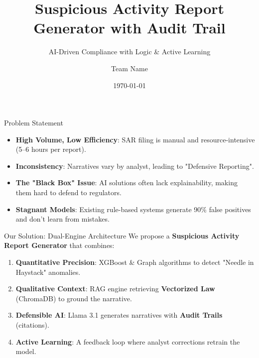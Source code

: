 \documentclass{beamer}
\title{Suspicious Activity Report Generator with Audit Trail}
\subtitle{AI-Driven Compliance with Logic \& Active Learning}
\author{Team Name}
\date{\today}
\begin{document}
\frame{\titlepage}

\begin{frame}{Problem Statement}
    \begin{itemize}
        \item \textbf{High Volume, Low Efficiency}: SAR filing is manual and resource-intensive (5--6 hours per report).
        \item \textbf{Inconsistency}: Narratives vary by analyst, leading to "Defensive Reporting".
        \item \textbf{The "Black Box" Issue}: AI solutions often lack explainability, making them hard to defend to regulators.
        \item \textbf{Stagnant Models}: Existing rule-based systems generate 90\% false positives and don't learn from mistakes.
    \end{itemize}
\end{frame}

\begin{frame}{Our Solution: Dual-Engine Architecture}
    We propose a \textbf{Suspicious Activity Report Generator} that combines:
    \vspace{0.5cm}
    \begin{enumerate}
        \item \textbf{Quantitative Precision}: XGBoost \& Graph algorithms to detect "Needle in Haystack" anomalies.
        \item \textbf{Qualitative Context}: RAG engine retrieving \textbf{Vectorized Law} (ChromaDB) to ground the narrative.
        \item \textbf{Defensible AI}: Llama 3.1 generates narratives with \textbf{Audit Trails} (citations).
        \item \textbf{Active Learning}: A feedback loop where analyst corrections retrain the model.
    \end{enumerate}
\end{frame}
\end{document}
